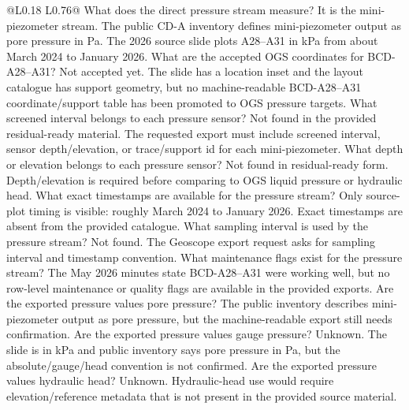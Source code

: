 \begin{longtable}{@{}L{0.18\textwidth} L{0.76\textwidth}@{}}
\toprule
{}
{ What does the direct pressure stream measure?}
{It is the mini-piezometer stream.  The public CD-A inventory defines
mini-piezometer output as pore pressure in Pa.  The 2026 source slide plots
A28--A31 in kPa from about March 2024 to January 2026.}
{ What are the accepted OGS coordinates for BCD-A28--A31?}
{Not accepted yet.  The slide has a location inset and the layout catalogue has
support geometry, but no machine-readable BCD-A28--A31 coordinate/support table has
been promoted to OGS pressure targets.}
{ What screened interval belongs to each pressure sensor?}
{Not found in the provided residual-ready material.  The requested export must
include screened interval, sensor
depth/elevation, or trace/support id for each mini-piezometer.}
{ What depth or elevation belongs to each pressure sensor?}
{Not found in residual-ready form.  Depth/elevation is required before comparing to
OGS liquid pressure or hydraulic head.}
{ What exact timestamps are available for the pressure stream?}
{Only source-plot timing is visible: roughly March 2024 to January 2026.  Exact
timestamps are absent from the provided catalogue.}
{ What sampling interval is used by the pressure stream?}
{Not found.  The Geoscope export request asks for sampling interval and timestamp
convention.}
{ What maintenance flags exist for the pressure stream?}
{The May 2026 minutes state BCD-A28--A31 were working well, but no row-level
maintenance or quality flags are available in the provided exports.}
{ Are the exported pressure values pore pressure?}
{The public inventory describes mini-piezometer output as pore pressure, but the
machine-readable export still needs confirmation.}
{ Are the exported pressure values gauge pressure?}
{Unknown.  The slide is in kPa and public inventory says pore pressure in Pa, but the
absolute/gauge/head convention is not confirmed.}
{ Are the exported pressure values hydraulic head?}
{Unknown.  Hydraulic-head use would require elevation/reference metadata that is not
present in the provided source material.}

\end{longtable}
